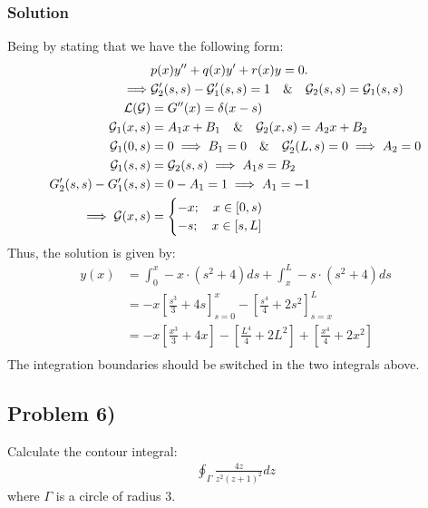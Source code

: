 \subsubsection*{Solution}
Being by stating that we have the following form:
\begin{align*}
    &p(x)y'' + q(x)y' + r(x)y = 0.\\
    \implies&\mathcal{G}_2'(s,s) - \mathcal{G}_1'(s,s) = 1 \quad \& \quad \mathcal{G}_2(s,s) = \mathcal{G}_1(s,s) \\
    \mathcal{L}(\mathcal{G}) &= G''(x) = \delta(x - s)\\
    \mathcal{G}_1(x,s) &= A_1x + B_1 \quad \&\quad \mathcal{G}_2(x,s) = A_2x + B_2\\
    \mathcal{G}_1(0,s) &= 0 \implies B_1 = 0 \quad\&\quad \mathcal{G}_2'(L,s) = 0 \implies A_2 = 0\\
    \mathcal{G}_1(s,s) &= \mathcal{G}_2(s,s)\implies A_1s = B_2\\
    G_2'(s,s) - G_1'(s,s) &= 0 - A_1 = 1 \implies A_1 = -1\\
    \implies \mathcal{G}(x,s) &= \begin{cases}
        -x; \quad x \in[0,s)\\
        -s; \quad x \in[s,L]
    \end{cases}
\end{align*}Thus, the solution is given by:
\begin{align*}
    y(x) &= \int_0^x -x \cdot (s^2 + 4)ds + \int_x^L -s \cdot (s^2 + 4)ds\\
    &= -x\left[\frac{s^3}{3}+4s\right]_{s = 0}^x - \left[\frac{s^4}{4} + 2s^2\right]_{s=x}^L\\
    &= -x\left[\frac{x^3}{3} + 4x\right] - \left[\frac{L^4}{4} + 2L^2\right] + \left[\frac{x^4}{4} + 2x^2\right]\\
\end{align*}The integration boundaries should be switched in the two integrals above.

\subsection*{Problem 6)}
Calculate the contour integral:
\begin{align*}
    \oint_\Gamma \frac{4z}{z^2(z + 1)^2}dz
\end{align*}where $\Gamma$ is a circle of radius $3$.

